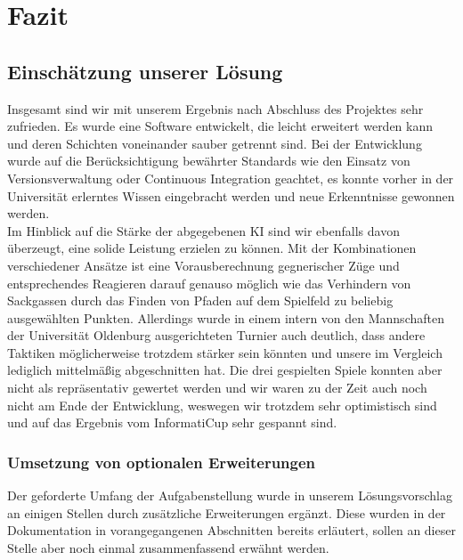 \chapter{Fazit}
\label{ch:fazit}

\section{Einschätzung unserer Lösung}
\label{sec:einschaetzung}

Insgesamt sind wir mit unserem Ergebnis nach Abschluss des Projektes sehr zufrieden.
Es wurde eine Software entwickelt, die leicht erweitert werden kann und deren Schichten voneinander sauber getrennt
sind.
Bei der Entwicklung wurde auf die Berücksichtigung bewährter Standards wie den Einsatz von Versionsverwaltung oder
Continuous Integration geachtet, es konnte vorher in der Universität erlerntes Wissen eingebracht werden und neue
Erkenntnisse gewonnen werden. \\

Im Hinblick auf die Stärke der abgegebenen \ac{KI} sind wir ebenfalls davon überzeugt, eine solide Leistung erzielen zu
können.
Mit der Kombinationen verschiedener Ansätze ist eine Vorausberechnung gegnerischer Züge und entsprechendes Reagieren
darauf genauso möglich wie das Verhindern von Sackgassen durch das Finden von Pfaden auf dem Spielfeld zu beliebig
ausgewählten Punkten.
Allerdings wurde in einem intern von den Mannschaften der Universität Oldenburg ausgerichteten Turnier auch deutlich,
dass andere Taktiken möglicherweise trotzdem stärker sein könnten und unsere im Vergleich lediglich mittelmäßig
abgeschnitten hat.
Die drei gespielten Spiele konnten aber nicht als repräsentativ gewertet werden und wir waren zu der Zeit auch noch
nicht am Ende der Entwicklung, weswegen wir trotzdem sehr optimistisch sind und auf das Ergebnis vom InformatiCup
sehr gespannt sind.

\subsection{Umsetzung von optionalen Erweiterungen}
\label{subsec:optionale-erweiterungen}

Der geforderte Umfang der Aufgabenstellung  wurde in unserem Lösungsvorschlag an einigen
Stellen durch zusätzliche Erweiterungen ergänzt.
Diese wurden in der Dokumentation in vorangegangenen Abschnitten bereits erläutert, sollen an dieser Stelle aber noch
einmal zusammenfassend erwähnt werden. \\

